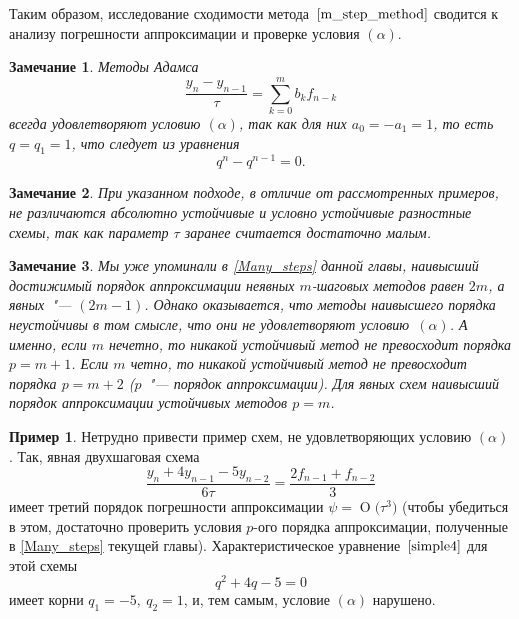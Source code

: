 \documentclass[11pt,a4paper,twoside,listtotoc,bibtotoc]{report}
\numberwithin{equation}{section}
\theoremstyle{definition}
\newtheorem*{example*}{Пример}
\theoremstyle{plain}
\newtheorem{note}{Замечание}[section]
\newcommand{\bigO}[1]{\ensuremath{\operatorname{O}\bigl(#1\bigr)}}
\begin{document}
Таким образом, исследование сходимости метода~$\eqref{m_step_method}$ сводится к
анализу погрешности аппроксимации и проверке условия $(\alpha)$.
%
\begin{note}
%
    Методы Адамса
    $$
        \dfrac{y_n-y_{n-1}}{\tau}=\sum\limits_{k=0}^mb_kf_{n-k}
    $$
    всегда удовлетворяют условию $(\alpha)$, так как для них
    $a_0=-a_1=1$, то есть $q=q_1=1$, что следует из уравнения
    $$
        q^n-q^{n-1}=0.
    $$
%
\end{note}
%
%
\begin{note}
%
    При указанном подходе, в отличие от рассмотренных примеров, не различаются
    абсолютно устойчивые и условно устойчивые разностные схемы, так как параметр $\tau$
    заранее считается достаточно малым.
%
\end{note}
%
%
\begin{note}
%
    Мы уже упоминали в \ref{Many_steps} данной главы, наивысший достижимый порядок аппроксимации неявных
    $m$-шаговых методов равен $2m$, а явных~"--- $(2m-1)$. Однако оказывается,
    что методы наивысшего порядка неустойчивы в том смысле, что они не
    удовлетворяют условию~$(\alpha)$. А именно, если $m$ нечетно, то никакой
    устойчивый метод не превосходит порядка $p=m+1$. Если $m$ четно, то никакой
    устойчивый метод не превосходит порядка $p=m+2$ ($p$~"--- порядок аппроксимации).
    Для явных схем наивысший порядок аппроксимации устойчивых методов $p=m$.
%
\end{note}
%
\begin{example*}
%
Нетрудно привести пример схем, не удовлетворяющих условию $(\alpha)$. Так, явная
двухшаговая схема
%
$$
    \dfrac{y_n+4y_{n-1}-5y_{n-2}}{6\tau} = \dfrac{2f_{n-1} + f_{n-2}}{3}
$$
%
имеет третий порядок погрешности аппроксимации $\psi = \bigO{\tau^3}$
(чтобы убедиться в этом, достаточно проверить условия $p$-ого порядка
аппроксимации, полученные в \ref{Many_steps} текущей главы).
Характеристическое уравнение~$\eqref{simple4}$ для этой схемы
%
$$
    q^2+4q-5=0
$$
%
имеет корни $q_1=-5,~q_2=1$, и, тем самым, условие $(\alpha)$ нарушено.
%
\end{example*}
%
%
\end{document}
